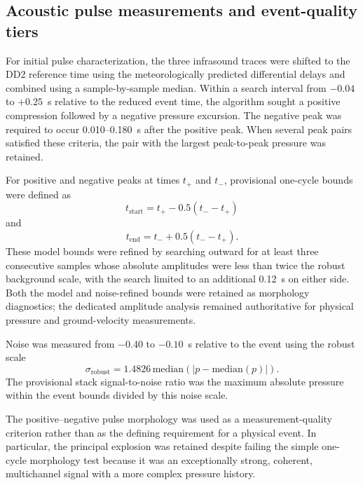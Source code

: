 \documentclass[]{seismica}
\begin{document}
\subsection{Acoustic pulse measurements and event-quality tiers}

For initial pulse characterization, the three infrasound traces were shifted to the DD2 reference time using the meteorologically predicted differential delays and combined using a sample-by-sample median. Within a search interval from $-0.04$ to $+0.25$~s relative to the reduced event time, the algorithm sought a positive compression followed by a negative pressure excursion. The negative peak was required to occur 0.010--0.180~s after the positive peak. When several peak pairs satisfied these criteria, the pair with the largest peak-to-peak pressure was retained.

For positive and negative peaks at times $t_+$ and $t_-$, provisional one-cycle bounds were defined as
\begin{equation}
  t_{\mathrm{start}} = t_+ - 0.5(t_- - t_+)
  \label{eq:pulse_start}
\end{equation}
and
\begin{equation}
  t_{\mathrm{end}} = t_- + 0.5(t_- - t_+).
  \label{eq:pulse_end}
\end{equation}
These model bounds were refined by searching outward for at least three
consecutive samples whose absolute amplitudes were less than twice the robust
background scale, with the search limited to an additional 0.12~s on either
side. Both the model and noise-refined bounds were retained as morphology
diagnostics; the dedicated amplitude analysis remained authoritative for
physical pressure and ground-velocity measurements.

Noise was measured from $-0.40$ to $-0.10$~s relative to the event using the robust scale
\begin{equation}
  \sigma_{\mathrm{robust}} = 1.4826\,\mathrm{median}\left(\left|p-\mathrm{median}(p)\right|\right).
  \label{eq:robust_noise}
\end{equation}
The provisional stack signal-to-noise ratio was the maximum absolute pressure within the event bounds divided by this noise scale.

The positive--negative pulse morphology was used as a measurement-quality criterion rather than as the defining requirement for a physical event. In particular, the principal explosion was retained despite failing the simple one-cycle morphology test because it was an exceptionally strong, coherent, multichannel signal with a more complex pressure history.
\end{document}

